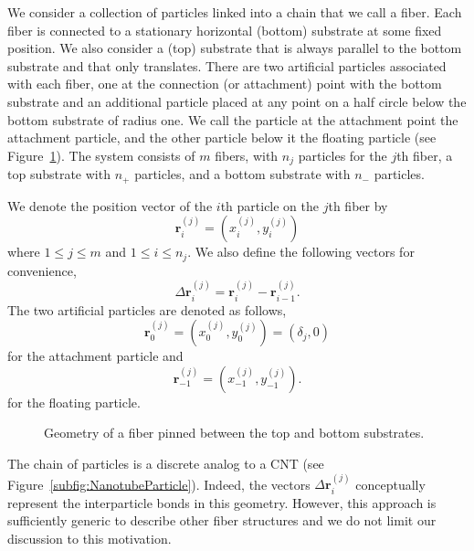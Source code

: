    We consider a collection of particles linked into a chain that we call a fiber. Each fiber is connected to a stationary horizontal (bottom) substrate at some fixed position. We also consider a (top) substrate that is always parallel to the bottom substrate and that only translates. There are two artificial particles associated with each fiber, one at the connection (or attachment) point with the bottom substrate and an additional particle placed at any point on a half circle below the bottom substrate of radius one. We call the particle at the attachment point the attachment particle, and the other particle below it the floating particle (see Figure~\ref{fig:Geometry}). The system consists of $m$ fibers, with $n_j$ particles for the $j$th fiber, a top substrate with $n_+$ particles, and a bottom substrate with $n_-$ particles.

We denote the position vector of the $i$th particle on the $j$th fiber by
\begin{equation}
	\textbf{r}_i^{(j)} = (x_i^{(j)},y_i^{(j)})
\end{equation}
where $1 \leq j \leq m$ and $1 \leq i \leq n_j$. We also define the following vectors for convenience,
\begin{equation}
	\Delta \textbf{r}_i^{(j)} = \textbf{r}_i^{(j)} - \textbf{r}_{i-1}^{(j)}.
\end{equation}
The two artificial particles are denoted as follows,
\begin{equation}
	\textbf{r}_0^{(j)} = (x_0^{(j)},y_0^{(j)}) = (\delta_j,0)
\end{equation}
for the attachment particle and
\begin{equation}
	\textbf{r}_{-1}^{(j)} = (x_{-1}^{(j)},y_{-1}^{(j)}).
\end{equation}
for the floating particle.

	\begin{figure}[t]
		\begin{center}
			
		\end{center}		
		\caption{Geometry of a fiber pinned between the top and bottom substrates.
		\label{fig:Geometry}}
	\end{figure}


	The chain of particles is a discrete analog to a CNT (see Figure~\ref{subfig:NanotubeParticle}). Indeed, the vectors $\Delta \textbf{r}_i^{(j)}$ conceptually represent the interparticle bonds in this geometry. However, this approach is sufficiently generic to describe other fiber structures and we do not limit our discussion to this motivation.
	
